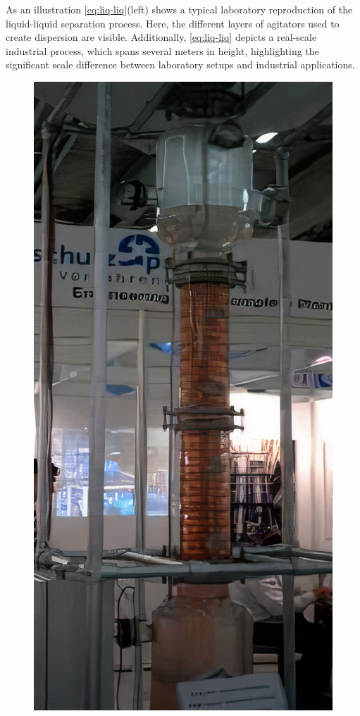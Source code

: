 As an illustration \ref{eq:liq-liq}(left) shows a typical laboratory reproduction of the liquid-liquid separation process. 
Here, the different layers of agitators used to create dispersion are visible. 
Additionally, \ref{eq:liq-liq} depicts a real-scale industrial process, which spans several meters in height, highlighting the significant scale difference between laboratory setups and industrial applications. 
\begin{figure}[h!]
    \centering
    \includegraphics[height=0.3\textheight]{image/liq-liq_LE_auto_x5.jpg}

\end{figure}
